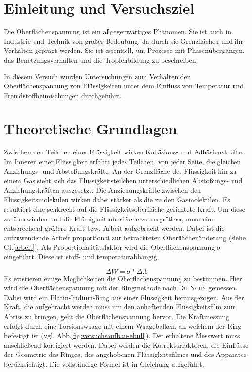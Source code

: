 \section{Einleitung und Versuchsziel}
\label{sec:aufgabenstellung}
Die Oberflächenspannung ist ein allgegenwärtiges Phänomen. Sie ist auch in Industrie und Technik von großer Bedeutung, da  durch sie Grenzflächen und ihr Verhalten geprägt werden. Sie ist essentiell, um Prozesse mit Phasenübergängen, das Benetzungsverhalten und die Tropfenbildung zu beschreiben.

In diesem Versuch wurden Untersuchungen zum Verhalten der Oberflächenspannung von Flüssigkeiten unter dem Einfluss von Temperatur und Fremdstoffbeimischungen durchgeführt. 

\section{Theoretische Grundlagen}

Zwischen den Teilchen einer Flüssigkeit wirken Kohäsions- und Adhäsionskräfte. Im Inneren einer Flüssigkeit erfährt jedes Teilchen, von jeder Seite, die gleichen Anziehungs- und Abstoßungskräfte. An der Grenzfläche der Flüssigkeit hin zu einem Gas sieht sich das Flüssigkeitsteilchen unterschiedlichen Abstoßungs- und Anziehungskräften ausgesetzt. Die Anziehungskräfte zwischen den Flüssigkeitsmolekülen wirken dabei stärker als die zu den Gasmolekülen. Es resultiert eine senkrecht auf die Flüssigkeitsoberfläche gerichtete Kraft. Um diese zu überwinden und die Flüssigkeitsoberfläche zu vergrößern, muss eine entsprechend größere Kraft bzw. Arbeit aufgebracht werden. Dabei ist die aufzuwendende Arbeit proportional zur betrachteten Oberflächenänderung (siehe Gl.\eqref{arbeit}). Als Proportionalitätsfaktor wird die Oberflächenspannung $\sigma$ eingeführt. Diese ist stoff- und temperaturabhängig. 

\begin{equation}\label{arbeit}
	\Delta W=\sigma*\Delta A
\end{equation}
Es existieren einige Möglichkeiten die Oberflächenspannung zu bestimmen. Hier wird die Oberflächenspannung mit der Ringmethode nach \textsc{Du Noüy} gemessen. Dabei wird ein Platin-Iridium-Ring aus einer Flüssigkeit herausgezogen. Aus der Kraft, die aufgebracht werden muss um den anhaftenden Flüssigkeitsfilm zum Abriss zu bringen, geht die Oberflächenspannung hervor. Die Kraftmessung erfolgt durch eine Torsionswaage mit einem Waagebalken, an welchem der Ring befestigt ist (vgl. Abb.\ref{fig:versuchsaufbau-ebull}). Der erhaltene Messwert muss anschließend korrigiert werden. Dabei werden die Korrekturfaktoren, die Einflüsse der Geometrie des Ringes, des angehobenen Flüssigkeitsfilmes und des Apparates berücksichtigt. Die vollständige Formel ist in Gleichung aufgeführt.

